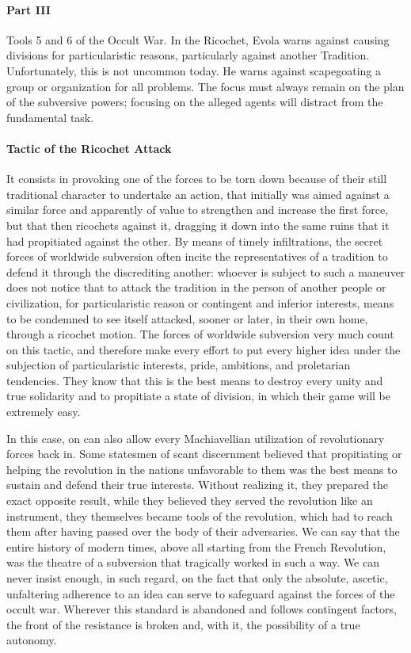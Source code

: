 \paragraph{Part III}


\begin{quotex}
Tools 5 and 6 of the Occult War. In the Ricochet, Evola warns against causing divisions for particularistic reasons, particularly against another Tradition. Unfortunately, this is not uncommon today. He warns against scapegoating a group or organization for all problems. The focus must always remain on the plan of the subversive powers; focusing on the alleged agents will distract from the fundamental task.
\end{quotex}


\paragraph{Tactic of the Ricochet Attack}


It consists in provoking one of the forces to be torn down because of their still traditional character to undertake an action, that initially was aimed against a similar force and apparently of value to strengthen and increase the first force, but that then ricochets against it, dragging it down into the same ruins that it had propitiated against the other. By means of timely infiltrations, the secret forces of worldwide subversion often incite the representatives of a tradition to defend it through the discrediting another: whoever is subject to such a maneuver does not notice that to attack the tradition in the person of another people or civilization, for particularistic reason or contingent and inferior interests, means to be condemned to see itself attacked, sooner or later, in their own home, through a ricochet motion. The forces of worldwide subversion very much count on this tactic, and therefore make every effort to put every higher idea under the subjection of particularistic interests, pride, ambitions, and proletarian tendencies. They know that this is the best means to destroy every unity and true solidarity and to propitiate a state of division, in which their game will be extremely easy.

In this case, on can also allow every Machiavellian utilization of revolutionary forces back in. Some statesmen of scant discernment believed that propitiating or helping the revolution in the nations unfavorable to them was the best means to sustain and defend their true interests. Without realizing it, they prepared the exact opposite result, while they believed they served the revolution like an instrument, they themselves became tools of the revolution, which had to reach them after having passed over the body of their adversaries. We can say that the entire history of modern times, above all starting from the French Revolution, was the theatre of a subversion that tragically worked in such a way. We can never insist enough, in such regard, on the fact that only the absolute, ascetic, unfaltering adherence to an idea can serve to safeguard against the forces of the occult war. Wherever this standard is abandoned and follows contingent factors, the front of the resistance is broken and, with it, the possibility of a true autonomy.

